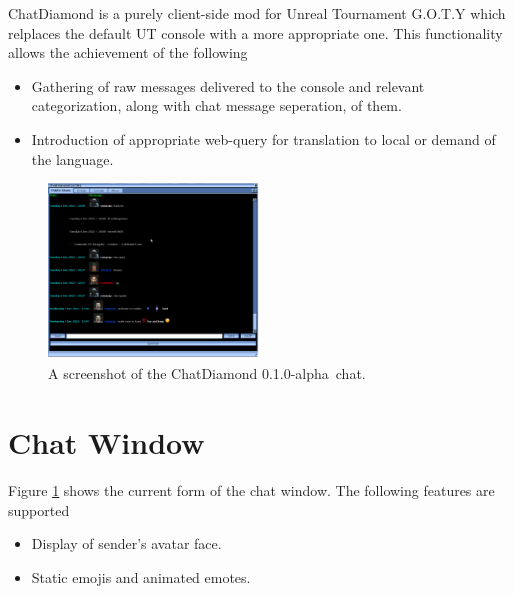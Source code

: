 \documentclass{article}
\newcommand{\ChatDiamondVersion}{0.1.0-alpha}
\begin{document}
ChatDiamond is a purely client-side mod for Unreal Tournament G.O.T.Y which relplaces the default UT console with a more appropriate one.  This functionality allows the achievement of the following
\begin{itemize}
\item Gathering of raw messages delivered to the console and relevant categorization, along with chat message seperation, of them.
\item Introduction of appropriate web-query for translation to local or demand of the language.
\end{itemize}

\begin{figure}
\centering
\label{fig:chatdiamond}
\includegraphics[width=0.5\textwidth]{img}
\caption{A screenshot of the ChatDiamond \ChatDiamondVersion~chat.}
\end{figure}

\section{Chat Window}
Figure \ref{fig:chatdiamond} shows the current form of the chat window. The following features are supported
\begin{itemize}
\item Display of sender's avatar face.
\item Static emojis and animated emotes.
\end{itemize}
\end{document}
